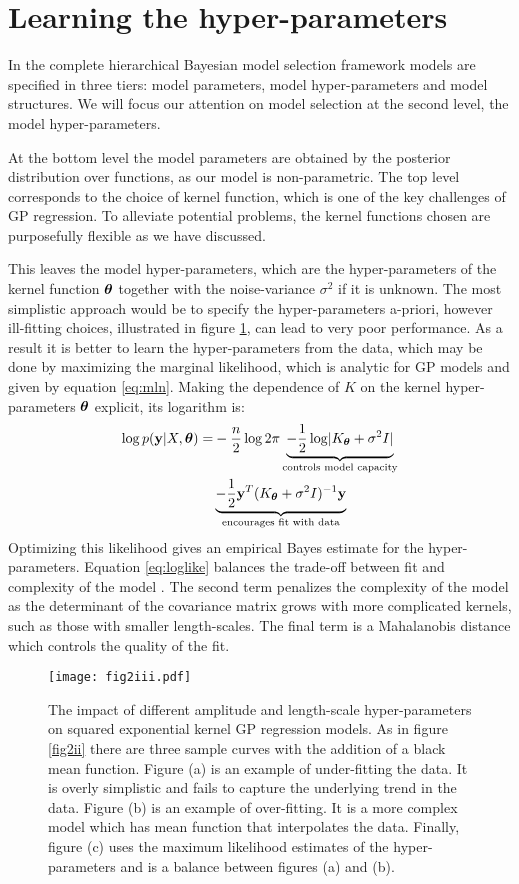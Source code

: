 \section{Learning the hyper-parameters} \label{sec:modelselection}

In the complete hierarchical Bayesian model selection framework \cite{mackay1992bayesian} models are specified in three tiers: model parameters, model hyper-parameters and model structures. We will focus our attention on model selection at the second level, the model hyper-parameters.

At the bottom level the model parameters are obtained by the posterior distribution over functions, as our model is non-parametric. The top level corresponds to the choice of kernel function, which is one of the key challenges of GP regression. To alleviate potential problems, the kernel functions chosen are purposefully flexible as we have discussed. 

This leaves the model hyper-parameters, which are the hyper-parameters of the kernel function $\bm{\theta}$ together with the noise-variance $\sigma^2$ if it is unknown. The most simplistic approach would be to specify the hyper-parameters a-priori, however ill-fitting choices, illustrated in figure \ref{fig:2iii}, can lead to very poor performance. As a result it is better to learn the hyper-parameters from the data, which may be done by maximizing the marginal likelihood, which is analytic for GP models and given by equation \ref{eq:mln}. Making the dependence of $K$ on the kernel hyper-parameters $\bm{\theta}$ explicit, its logarithm is:
%
\begin{align} \label{eq:loglike}
\nonumber \log p(\mathbf{y} \vert X, \bm{\theta}) = 
&-\frac{n}{2}\log2\pi 
\underbrace{-\frac{1}{2}\log\lvert K_{\bm{\theta}} + \sigma^2I \rvert}_{\text{controls model capacity}} \\
& \underbrace{- \frac{1}{2} \mathbf{y}^T(K_{\bm{\theta}} + \sigma^2I)^{-1}\mathbf{y}}_{\text{encourages fit with data}}
\end{align}
%
Optimizing this likelihood gives an empirical Bayes estimate for the hyper-parameters. Equation \ref{eq:loglike} balances the trade-off between fit and complexity of the model \cite{duvenaud2014automatic}. The second term penalizes the complexity of the model as the determinant of the covariance matrix grows with more complicated kernels, such as those with  smaller length-scales. The final term is a Mahalanobis distance which controls the quality of the fit.

\begin{figure}
\centering
\texttt{[image: fig2iii.pdf]}
\caption{The impact of different amplitude and length-scale hyper-parameters on squared exponential kernel GP regression models. As in figure \ref{fig2ii} there are three sample curves with the addition of a black mean function. Figure (a) is an example of under-fitting the data. It is overly simplistic and fails to capture the underlying trend in the data. Figure (b) is an example of over-fitting. It is a more complex model which has mean function that interpolates the data. Finally, figure (c) uses the maximum likelihood estimates of the hyper-parameters and is a balance between figures (a) and (b).} \label{fig:2iii}
\end{figure}

